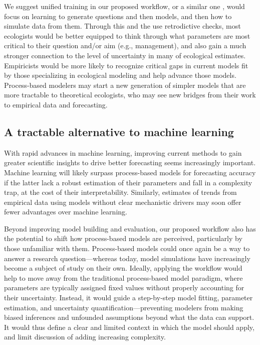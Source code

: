 \documentclass[11pt]{article}
\begin{document}
We suggest unified training in our proposed workflow, or a similar one \citep{betanworkflow,Gelman2020, grinsztajn2021,vandeschoot2021}, would focus on learning to generate questions and then models, and then how to simulate data from them. Through this and the use retrodictive checks, most ecologists would be better equipped to think through what parameters are most critical to their question and/or aim (e.g., management), and also gain a much stronger connection to the level of uncertainty in many of ecological estimates. Empiricists would be more likely to recognize critical gaps in current models fit by those specializing in ecological modeling and help advance those models. Process-based modelers may start a new generation of simpler models that are more tractable to theoretical ecologists, who may see new bridges from their work to empirical data and forecasting.

\subsection{A tractable alternative to machine learning}

With rapid advances in machine learning, improving current methods to gain greater scientific insights to drive better forecasting seems increasingly important. Machine learning will likely surpass process-based models for forecasting accuracy if the latter lack a robust estimation of their parameters and fall in a complexity trap, at the cost of their interpretability. Similarly, estimates of trends from empirical data using models without clear mechanistic drivers may soon offer fewer advantages over machine learning. 

Beyond improving model building and evaluation, our proposed workflow also has the potential to shift how process-based models are perceived, particularly by those unfamiliar with them.
Process-based models could once again be a way to answer a research question---whereas today, model simulations have increasingly become a subject of study on their own.
Ideally, applying the workflow would help to move away from the traditional process-based model paradigm, where parameters are typically assigned fixed values without properly accounting for their uncertainty. Instead, it would guide a step-by-step model fitting, parameter estimation, and uncertainty quantification---preventing modelers from making biased inferences and unfounded assumptions beyond what the data can support. It would thus define a clear and limited context in which the model should apply, and limit discussion of adding increasing complexity. 
\end{document}
